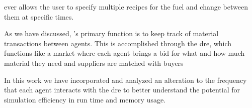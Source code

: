 \gls{ever} allows the user to specify multiple recipes for the fuel and
change between them at specific times.


As we have discussed, \cyclus's primary function is to keep track of
material transactions between agents. This is accomplished through the
\gls{dre}, which functions like a market where each agent brings a bid
for what and how much material they need and suppliers are matched with
buyers %

In this work we have incorporated and analyzed an alteration to the
frequency that each agent interacts with the \gls{dre} to better
understand the potential for simulation efficiency in run time and
memory usage.